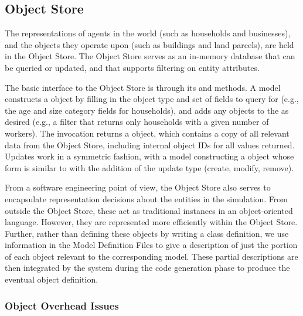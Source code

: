 
\subsection{Object Store}
\label{sec:object-store}

The representations of agents in the world (such as households and
businesses), and the objects they operate upon (such as buildings and land
parcels), are held in the Object Store.  The Object Store serves as an
in-memory database that can be queried or updated, and that supports
filtering on entity attributes.

The basic interface to the Object Store is through its 
and  methods.  A model constructs a  object
by filling in the object type and set of fields to query for (e.g., the
age and size category fields for households), and adds any 
objects to the  as desired (e.g., a filter
that returns only households with a given number of workers).  The
 invocation returns a  object, which
contains a copy of all relevant data from the Object Store, including
internal object {IDs} for all values returned.  
Updates work in a symmetric fashion, with a model constructing
a  object whose form is similar to  with
the addition of the update type (create, modify, remove).

From a software engineering point of view, the Object Store also serves to
encapsulate representation decisions about the entities in the simulation.
From outside the Object Store, these act as traditional instances in an
object-oriented language.  However, they are represented more efficiently
within the Object Store.  Further, rather than defining these objects by
writing a class definition, we use information in the Model Definition
Files to give a description of just the portion of each object relevant to
the corresponding model.  These partial descriptions are then integrated by
the system during the code generation phase to produce the eventual object
definition.

\subsubsection{Object Overhead Issues}
\label{sec:object-overhead}


